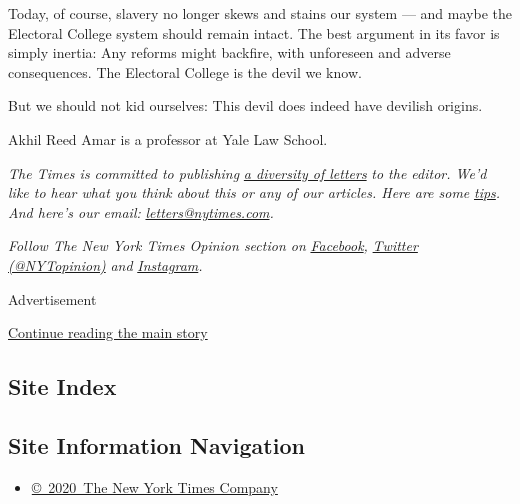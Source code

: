 Today, of course, slavery no longer skews and stains our system --- and
maybe the Electoral College system should remain intact. The best
argument in its favor is simply inertia: Any reforms might backfire,
with unforeseen and adverse consequences. The Electoral College is the
devil we know.

But we should not kid ourselves: This devil does indeed have devilish
origins.

Akhil Reed Amar is a professor at Yale Law School.

\emph{The Times is committed to publishing}
\href{https://www.nytimes.com/2019/01/31/opinion/letters/letters-to-editor-new-york-times-women.html}{\emph{a
diversity of letters}} \emph{to the editor. We'd like to hear what you
think about this or any of our articles. Here are some}
\href{https://help.nytimes.com/hc/en-us/articles/115014925288-How-to-submit-a-letter-to-the-editor}{\emph{tips}}\emph{.
And here's our email:}
\href{mailto:letters@nytimes.com}{\emph{letters@nytimes.com}}\emph{.}

\emph{Follow The New York Times Opinion section on}
\href{https://www.facebook.com/nytopinion}{\emph{Facebook}}\emph{,}
\href{http://twitter.com/NYTOpinion}{\emph{Twitter (@NYTopinion)}}
\emph{and}
\href{https://www.instagram.com/nytopinion/}{\emph{Instagram}}\emph{.}

Advertisement

\protect\hyperlink{after-bottom}{Continue reading the main story}

\hypertarget{site-index}{%
\subsection{Site Index}\label{site-index}}

\hypertarget{site-information-navigation}{%
\subsection{Site Information
Navigation}\label{site-information-navigation}}

\begin{itemize}
\tightlist
\item
  \href{https://help.nytimes.com/hc/en-us/articles/115014792127-Copyright-notice}{©~2020~The
  New York Times Company}
\end{itemize}

